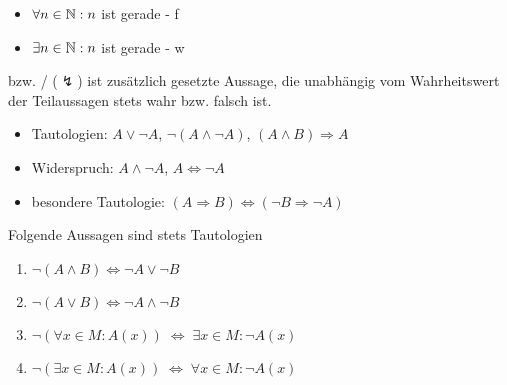 \begin{example}
	\begin{itemize}
		\item $\forall n\in\mathbb{N}:n$ ist gerade - f
		\item $\exists n\in\mathbb{N}:n$ ist gerade - w
	\end{itemize}
\end{example}

\begin{definition}
	 bzw. \slash{} ($\lightning$) ist zusätzlich gesetzte Aussage, die unabhängig vom Wahrheitswert der Teilaussagen stets wahr bzw. falsch ist.
\end{definition}

\begin{example}
	\begin{itemize}
		\item Tautologien: $A\lor\neg A$, $\neg(A\land\neg A)$, $(A\land B)\Rightarrow A$
		\item Widerspruch: $A\land\neg A$, $A\iff\neg A$
		\item besondere Tautologie: $(A\Rightarrow B)\iff (\neg B\Rightarrow \neg A)$
	\end{itemize}
\end{example}

\begin{proposition}
	Folgende Aussagen sind stets Tautologien
	\begin{enumerate}[label={\alph*)}]
		\item $\neg(A\land B) \Leftrightarrow \neg A \lor \neg B$
		\item $\neg(A\lor B) \Leftrightarrow \neg A\land \neg B$
		\item $\neg (\forall x\in M: A(x)) \;\Leftrightarrow \; \exists x\in M:\neg A(x)$
		\item $\neg (\exists x\in M: A(x)) \;\Leftrightarrow \;\forall x\in M:\neg A(x)$
	\end{enumerate}
\end{proposition}

